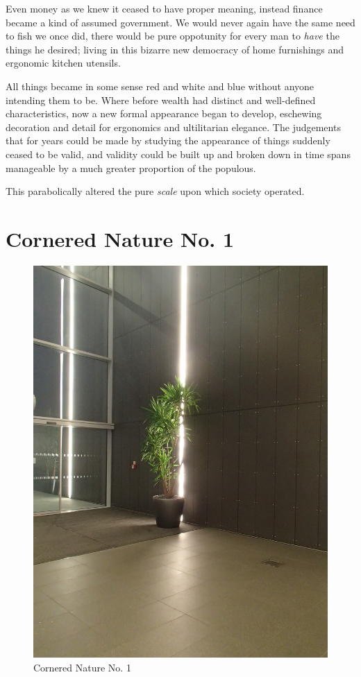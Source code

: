 \documentclass{book}
\begin{document}
Even money as we knew it ceased to have proper meaning, instead finance became
a kind of assumed government. We would never again have the same need to fish
we once did, there would be pure oppotunity for every man to \emph{have} the
things he desired; living in this bizarre new democracy of home furnishings and
ergonomic kitchen utensils.

All things became in some sense red and white and blue without anyone intending
them to be. Where before wealth had distinct and well-defined characteristics,
now a new formal appearance began to develop, eschewing decoration and detail
for ergonomics and ultilitarian elegance. The judgements that for years could
be made by studying the appearance of things suddenly ceased to be valid, and
validity could be built up and broken down in time spans manageable by a
much greater proportion of the populous.

This parabolically altered the pure \emph{scale} upon which society operated.

\chapter{Cornered Nature No. 1}

\begin{figure}
\centering
\includegraphics[width=\textwidth,angle=-90]{figures/P1050156.JPG}
\caption{Cornered Nature No. 1}
\end{figure}
\end{document}
